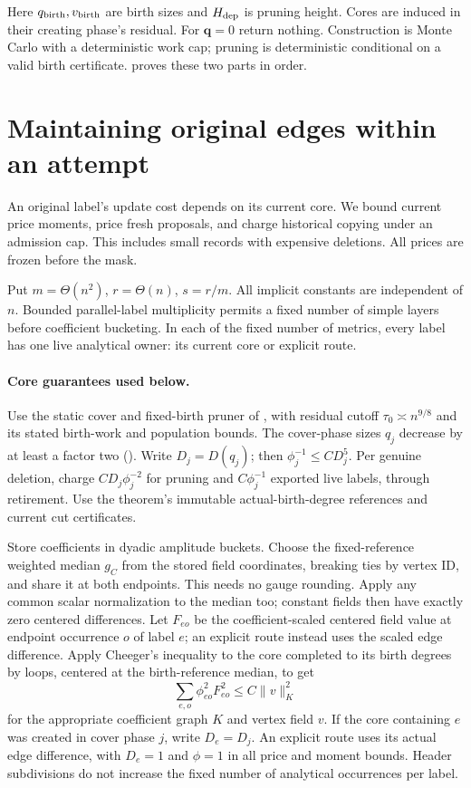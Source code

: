 \documentclass[11pt]{article}
\theoremstyle{remark}
\newcommand{\qq}{\mathbf q}
\newcommand{\norm}[1]{\lVert#1\rVert}
\begin{document}
Here $q_{\rm birth},v_{\rm birth}$ are birth sizes and $H_{\rm dep}$ is pruning height.
Cores are induced in their creating phase's residual.
For $\qq=0$ return nothing.
Construction is Monte Carlo with a deterministic work cap; pruning is
deterministic conditional on a valid birth certificate.
 proves these two parts in order.

\section{Maintaining original edges within an attempt}
\label{sec:ram27-owner}

An original label's update cost depends on its current core.
We bound current price moments, price fresh proposals, and charge historical
copying under an admission cap.
This includes small records with expensive deletions.
All prices are frozen before the mask.

Put $m=\Theta(n^2)$, $r=\Theta(n)$, $s=r/m$.
All implicit constants are independent of $n$.
Bounded parallel-label multiplicity permits a fixed number of simple layers
before coefficient bucketing.
In each of the fixed number of metrics, every label has one live analytical
owner: its current core or explicit route.

\paragraph{Core guarantees used below.}
Use the static cover and fixed-birth pruner of , with
residual cutoff $\tau_0\asymp n^{9/8}$ and its stated birth-work and population
bounds.
The cover-phase sizes $q_j$ decrease by at least a factor two
().
Write $D_j=D(q_j)$; then $\phi_j^{-1}\le CD_j^5$.
Per genuine deletion, charge $CD_j\phi_j^{-2}$ for pruning and $C\phi_j^{-1}$
exported live labels, through retirement.
Use the theorem's immutable actual-birth-degree references and current cut
certificates.

Store coefficients in dyadic amplitude buckets.
Choose the fixed-reference weighted median $g_C$ from the stored field
coordinates, breaking ties by vertex ID, and share it at both endpoints.
This needs no gauge rounding.
Apply any common scalar normalization to the median too; constant fields then
have exactly zero centered differences.
Let $F_{eo}$ be the coefficient-scaled centered field value at endpoint
occurrence $o$ of label $e$; an explicit route instead uses the scaled edge
difference.
Apply Cheeger's inequality to the core completed to its birth degrees by loops,
centered at the birth-reference median, to get
\begin{equation}\label{eq:ram27-owner-gate}
 \sum_{e,o}\phi_{eo}^2 F_{eo}^2\le C\norm{v}_K^2
\end{equation}
for the appropriate coefficient graph $K$ and vertex field $v$.
If the core containing $e$ was created in cover phase $j$, write $D_e=D_j$.
An explicit route uses its actual edge difference, with $D_e=1$ and $\phi=1$ in
all price and moment bounds.
Header subdivisions do not increase the fixed number of analytical occurrences
per label.
\end{document}
